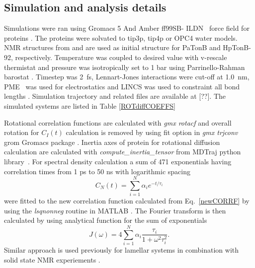 \documentclass[pre,aps,floatfix,authordate1-4,twocolumn]{revtex4-1}
\begin{document}
\subsection{Simulation and analysis details}
Simulations were ran using Gromacs 5 \cite{abraham15} And Amber ff99SB- ILDN~\cite{lindorff10}
force field for proteins . The proteins were solvated
to tip3p\cite{jorgensen83}, tip4p \cite{jorgensen83} or OPC4 \cite{izadi14} water models.
NMR structures from \cite{??} and \cite{ciragan16} are used as initial structure for 
PaTonB and HpTonB-92, respectively.
Temperature was coupled to desired value with v-rescale thermistat \cite{bussi07} and pressure was 
isotropically set to 1 bar using Parrinello-Rahman barostat \cite{parrinello81}.
Timestep was 2~fs, Lennart-Jones interactions were cut-off at 1.0~nm,
PME~\cite{darden93,essman95} was used for electrostatics and LINCS was used
to constraint all bond lengths \cite{hess07}. Simulation trajectory and related
files are available at [??].
The simulated systems are listed
in Table \ref{ROTdiffCOEFFS}

Rotational correlation functions are calculated with {\it gmx rotacf}
and overall rotation for $C_I(t)$ calculation is removed by using fit option
in {\it gmx trjconv} grom Gromacs package \cite{gromacsMANUAL}.
Inertia axes of protein for rotational diffusion calculation
are calculated with {\it compute\_inertia\_tensor} from
MDTraj python library~\cite{McGibbon2015MDTraj}.
For spectral density calculation a sum of 471 exponentials
having correlation times from 1 ps to 50 ns with logarithmic
spacing
\begin{equation}\label{gprime_fit}
C_N(t)=\sum_{i=1}^{N}\alpha_i e^{-t/\tau_i}
\end{equation}
were fitted to the new correlation function
calculated from Eq.~\ref{newCORRF}
by using the {\it lsqnonneg} routine in MATLAB \cite{matlab}.
The Fourier transform is then calculated by using analytical function
for the sum of exponentials 
\begin{equation}\label{FTanal}
J(\omega) =  4 \sum_{i=1}^{N}\alpha_i\frac{\tau_i}{1+\omega^2\tau_i^2}.
\end{equation}
Similar approach is used previously for lamellar systems in combination
with solid state NMR experiements \cite{nowacka13,ferreira15}.
\end{document}

